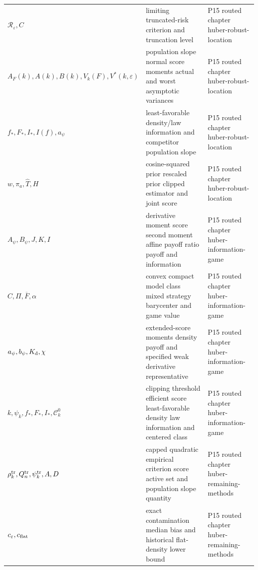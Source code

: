 \begin{longtable}{@{}p{}p{}p{}@{}}
\(\mathcal R_\varepsilon,\allowbreak C\) & limiting truncated-risk criterion and truncation level & P15 routed chapter huber-\allowbreak{}robust-\allowbreak{}location \\
\(A_F(k),\allowbreak A(k),\allowbreak B(k),\allowbreak V_k(F),\allowbreak V^*(k,\allowbreak \varepsilon)\) & population slope normal score moments actual and worst asymptotic variances & P15 routed chapter huber-\allowbreak{}robust-\allowbreak{}location \\
\(f_*,\allowbreak F_*,\allowbreak I_*,\allowbreak I(f),\allowbreak a_\psi\) & least-favorable density/law information and competitor population slope & P15 routed chapter huber-\allowbreak{}robust-\allowbreak{}location \\
\(w,\allowbreak \pi_a,\allowbreak \widehat T,\allowbreak H\) & cosine-squared prior rescaled prior clipped estimator and joint score & P15 routed chapter huber-\allowbreak{}robust-\allowbreak{}location \\
\(A_\psi,\allowbreak B_\psi,\allowbreak J,\allowbreak K,\allowbreak I\) & derivative moment score second moment affine payoff ratio payoff and information & P15 routed chapter huber-\allowbreak{}information-\allowbreak{}game \\
\(C,\allowbreak \Pi,\allowbreak \overline F,\allowbreak \alpha\) & convex compact model class mixed strategy barycenter and game value & P15 routed chapter huber-\allowbreak{}information-\allowbreak{}game \\
\(a_\psi,\allowbreak b_\psi,\allowbreak K_{\rm d},\allowbreak \chi\) & extended-score moments density payoff and specified weak derivative representative & P15 routed chapter huber-\allowbreak{}information-\allowbreak{}game \\
\(k,\allowbreak \psi_k,\allowbreak f_*,\allowbreak F_*,\allowbreak I_*,\allowbreak \mathcal C_k^0\) & clipping threshold efficient score least-favorable density law information and centered class & P15 routed chapter huber-\allowbreak{}information-\allowbreak{}game \\
\(\rho_k^{\rm tr},\allowbreak Q_n^{\rm tr},\allowbreak \psi_k^{\rm tr},\allowbreak A,\allowbreak D\) & capped quadratic empirical criterion score active set and population slope quantity & P15 routed chapter huber-\allowbreak{}remaining-\allowbreak{}methods \\
\(c_\varepsilon,\allowbreak c_{\rm flat}\) & exact contamination median bias and historical flat-density lower bound & P15 routed chapter huber-\allowbreak{}remaining-\allowbreak{}methods \\

\end{longtable}
